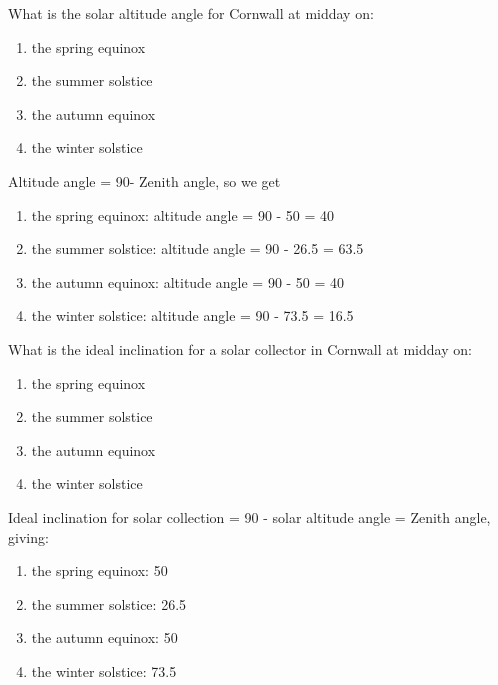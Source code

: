 \documentclass{article} %
\begin{document}
\begin{question}
What is the solar altitude angle for Cornwall at midday on:
    \begin{enumerate}[label=\alph*)]
        \item the spring equinox
        \item the summer solstice
        \item the autumn equinox
        \item the winter solstice
    \end{enumerate}
\end{question}
\begin{solution}
Altitude angle = 90\degree - Zenith angle, so we get
    \begin{enumerate}[label=\alph*)]
        \item the spring equinox: altitude angle = 90 - 50 = 40\degree
        \item the summer solstice: altitude angle = 90 - 26.5 = 63.5\degree
        \item the autumn equinox: altitude angle = 90 - 50 = 40\degree
        \item the winter solstice: altitude angle = 90 -  73.5 = 16.5\degree
    \end{enumerate}
\end{solution}

\begin{question}
What is the ideal inclination for a solar collector in Cornwall at midday on:
    \begin{enumerate}[label=\alph*)]
        \item the spring equinox
        \item the summer solstice
        \item the autumn equinox
        \item the winter solstice
    \end{enumerate}
\end{question}
\begin{solution}
Ideal inclination for solar collection = 90 - solar altitude angle = Zenith angle, giving:
    \begin{enumerate}[label=\alph*)]
        \item the spring equinox: 50\degree
        \item the summer solstice: 26.5\degree
        \item the autumn equinox: 50\degree
        \item the winter solstice: 73.5\degree
    \end{enumerate}
\end{solution}
\end{document}
